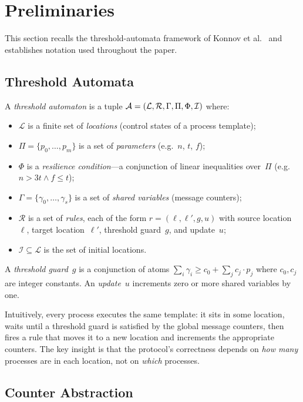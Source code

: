\section{Preliminaries}\label{sec:prelim}

This section recalls the threshold-automata framework of Konnov et
al.~\cite{KonnovVW2015, KonnovLVW2017} and establishes notation used
throughout the paper.

\subsection{Threshold Automata}

A \emph{threshold automaton} is a tuple
$\mathcal{A} = (\mathcal{L}, \mathcal{R}, \Gamma, \Pi, \Phi, \mathcal{I})$
where:
\begin{itemize}
  \item $\mathcal{L}$ is a finite set of \emph{locations} (control
    states of a process template);
  \item $\Pi = \{p_0, \ldots, p_m\}$ is a set of \emph{parameters}
    (e.g.\ $n$, $t$, $f$);
  \item $\Phi$ is a \emph{resilience condition}---a conjunction of
    linear inequalities over~$\Pi$ (e.g.\ $n > 3t \wedge f \leq t$);
  \item $\Gamma = \{\gamma_0, \ldots, \gamma_s\}$ is a set of
    \emph{shared variables} (message counters);
  \item $\mathcal{R}$ is a set of \emph{rules}, each of the form
    $r = (\ell, \ell', g, u)$ with source location~$\ell$, target
    location~$\ell'$, threshold guard~$g$, and update~$u$;
  \item $\mathcal{I} \subseteq \mathcal{L}$ is the set of initial
    locations.
\end{itemize}

A \emph{threshold guard}~$g$ is a conjunction of atoms
$\sum_{i} \gamma_i \geq c_0 + \sum_j c_j \cdot p_j$ where
$c_0, c_j$ are integer constants.  An \emph{update}~$u$ increments
zero or more shared variables by one.

Intuitively, every process executes the same template: it sits in some
location, waits until a threshold guard is satisfied by the global
message counters, then fires a rule that moves it to a new location
and increments the appropriate counters.  The key insight is that
the protocol's correctness depends on \emph{how many} processes are
in each location, not on \emph{which} processes.

\subsection{Counter Abstraction}\label{sec:counter-abstraction}

